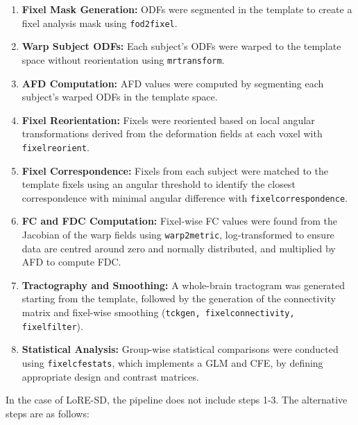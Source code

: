 \begin{enumerate}
    \item \textbf{Fixel Mask Generation:} ODFs were segmented in the template to create a fixel analysis mask using \texttt{fod2fixel}.

    \item \textbf{Warp Subject ODFs:} Each subject's ODFs were warped to the template space without reorientation using  \texttt{mrtransform}.

    \item \textbf{AFD Computation:} AFD values were computed by segmenting each subject's warped ODFs in the template space.

    \item \textbf{Fixel Reorientation:} Fixels were reoriented based on local angular transformations derived from the deformation fields at each voxel with \texttt{fixelreorient}.

    \item \textbf{Fixel Correspondence:} Fixels from each subject were matched to the template fixels using an angular threshold to identify the closest correspondence with minimal angular difference with \texttt{fixelcorrespondence}.

    \item \textbf{FC and FDC Computation:} Fixel-wise FC values were found from the Jacobian of the warp fields using \texttt{warp2metric}, log-transformed to ensure data are centred around zero and normally distributed, and multiplied by AFD to compute FDC.

    \item \textbf{Tractography and Smoothing:} A whole-brain tractogram was generated starting from the template, followed by the generation of the connectivity matrix and fixel-wise smoothing (\texttt{tckgen, fixelconnectivity, fixelfilter}).

    \item \textbf{Statistical Analysis:} Group-wise statistical comparisons were conducted using \texttt{fixelcfestats}, which implements a GLM and CFE, by defining appropriate design and contrast matrices.
\end{enumerate}

In the case of LoRE-SD, the pipeline does not include steps 1-3. The alternative steps are as follows:

